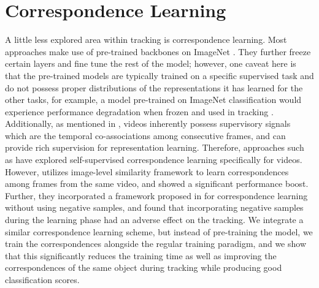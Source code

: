 \section{Correspondence Learning}
A little less explored area within tracking is correspondence learning. Most approaches make use of pre-trained backbones on ImageNet \cite{deng2009imagenet}. They further freeze certain layers and fine tune the rest of the model; however, one caveat here is that the pre-trained models are typically trained on a specific supervised task and do not possess proper distributions of the representations it has learned for the other tasks, for example, a model pre-trained on ImageNet classification would experience performance degradation when frozen and used in tracking \cite{xu2021rethinking}.  Additionally, as mentioned in \cite{wu2021progressive}, videos inherently possess supervisory signals which are the temporal co-associations among consecutive frames, and can provide rich supervision for representation learning. Therefore, approaches such as \cite{xu2021rethinking, li2022locality, yuan2022contextualized, gordon2020watching} have explored self-supervised correspondence learning specifically for videos. However, \cite{xu2021rethinking} utilizes image-level similarity framework to learn correspondences among frames from the same video, and showed a significant performance boost. Further, they incorporated a framework proposed in \cite{chen2021exploring} for correspondence learning without using negative samples, and found that incorporating negative samples during the learning phase had an adverse effect on the tracking. We integrate a similar correspondence learning scheme, but instead of pre-training the model, we train the correspondences alongside the regular training paradigm, and we show that this significantly reduces the training time as well as improving the correspondences of the same object during tracking while producing good classification scores.  


